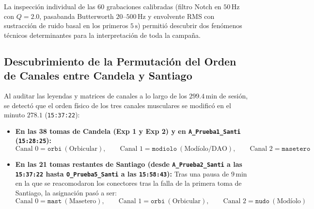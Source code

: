\documentclass[11pt,a4paper]{article}
\begin{document}
La inspección individual de las 60 grabaciones calibradas (filtro Notch en $50\,\text{Hz}$ con $Q=2.0$, pasabanda Butterworth $20\text{--}500\,\text{Hz}$ y envolvente RMS con sustracción de ruido basal en los primeros $5\,\text{s}$) permitió descubrir dos fenómenos técnicos determinantes para la interpretación de toda la campaña.

\subsection{Descubrimiento de la Permutación del Orden de Canales entre Candela y Santiago}
Al auditar las leyendas y matrices de canales a lo largo de los $299.4\,\text{min}$ de sesión, se detectó que el orden físico de los tres canales musculares se modificó en el minuto $278.1$ (\texttt{15:37:22}):
\begin{itemize}
    \item \textbf{En las 38 tomas de Candela (Exp 1 y Exp 2) y en \texttt{A\_Prueba1\_Santi} (\texttt{15:28:25}):}
    \begin{equation}
        \text{Canal 0} = \texttt{orbi} \ (\text{Orbicular}), \qquad \text{Canal 1} = \texttt{modiolo} \ (\text{Modíolo/DAO}), \qquad \text{Canal 2} = \texttt{masetero}
    \end{equation}
    \item \textbf{En las 21 tomas restantes de Santiago (desde \texttt{A\_Prueba2\_Santi} a las \texttt{15:37:22} hasta \texttt{O\_Prueba5\_Santi} a las \texttt{15:58:43}):} Tras una pausa de $9\,\text{min}$ en la que se reacomodaron los conectores tras la falla de la primera toma de Santiago, la asignación pasó a ser:
    \begin{equation}
        \text{Canal 0} = \texttt{mast} \ (\text{Masetero}), \qquad \text{Canal 1} = \texttt{orbi} \ (\text{Orbicular}), \qquad \text{Canal 2} = \texttt{nudo} \ (\text{Modíolo})
    \end{equation}
\end{itemize}
\end{document}
